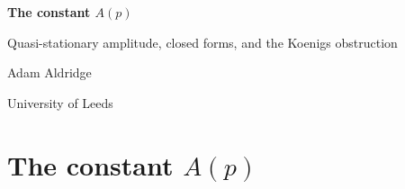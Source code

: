 \documentclass[11pt]{report}
\begin{document}
\begin{titlepage}
\centering
\vspace*{4cm}
{\LARGE\bfseries The constant \texorpdfstring{$A(p)$}{A(p)}\par}
\vspace{6pt}
{\large Quasi-stationary amplitude, closed forms, and the Koenigs obstruction\par}
\vspace{2.5cm}
{\large Adam Aldridge\par}
\vspace{6pt}
{\ChA\par}
\vspace{4pt}
{University of Leeds\par}
\end{titlepage}

\tableofcontents
\clearpage

\chapter{The constant \texorpdfstring{$A(p)$}{A(p)}}
\label{a:ch:Ap}













\appendix



\FloatBarrier
\begingroup
\footnotesize


\endgroup
\end{document}

